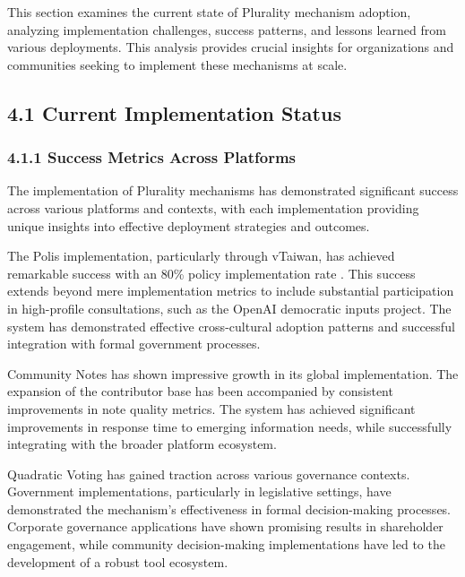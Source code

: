 This section examines the current state of Plurality mechanism adoption, analyzing implementation challenges, success patterns, and lessons learned from various deployments. This analysis provides crucial insights for organizations and communities seeking to implement these mechanisms at scale.

\hypertarget{current-implementation-status}{%
\subsection{4.1 Current Implementation Status}\label{current-implementation-status}}

\hypertarget{success-metrics-across-platforms}{%
\subsubsection{4.1.1 Success Metrics Across Platforms}\label{success-metrics-across-platforms}}

The implementation of Plurality mechanisms has demonstrated significant success across various platforms and contexts, with each implementation providing unique insights into effective deployment strategies and outcomes.

The Polis implementation, particularly through vTaiwan, has achieved remarkable success with an 80\% policy implementation rate \citep{vtaiwan2023}. This success extends beyond mere implementation metrics to include substantial participation in high-profile consultations, such as the OpenAI democratic inputs project. The system has demonstrated effective cross-cultural adoption patterns and successful integration with formal government processes.

Community Notes has shown impressive growth in its global implementation. The expansion of the contributor base has been accompanied by consistent improvements in note quality metrics. The system has achieved significant improvements in response time to emerging information needs, while successfully integrating with the broader platform ecosystem.

Quadratic Voting has gained traction across various governance contexts. Government implementations, particularly in legislative settings, have demonstrated the mechanism's effectiveness in formal decision-making processes. Corporate governance applications have shown promising results in shareholder engagement, while community decision-making implementations have led to the development of a robust tool ecosystem.

